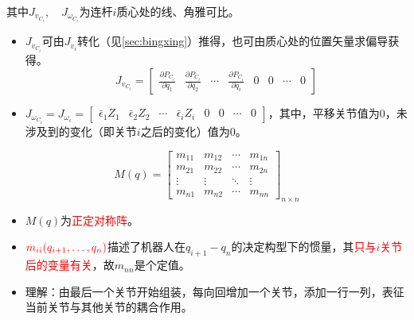 \documentclass[
12pt, %
a4paper, 
oneside, %
]{scrartcl}
\begin{document}
其中$ J_{v_{C_i}}, \quad J_{\omega_{C_i}} $为连杆$ i $质心处的线、角雅可比。
\begin{itemize}
\item $ J_{v_{C_i}} $可由$ J_{v_i} $转化（见\ref{sec:bingxing}）推得，也可由质心处的位置矢量求偏导获得。
$$ J_{v_{C_i}} = \begin{bmatrix} \frac{\partial P_{C_i}}{\partial q_1} & \frac{\partial P_{C_i}}{\partial q_2} & \cdots & \frac{\partial P_{C_i}}{\partial q_i} & 0 & 0 & \cdots & 0 \end{bmatrix} $$
\item $ J_{\omega_{C_i}} = J_{\omega_i} = \begin{bmatrix} \bar{\epsilon}_1 Z_1 & \bar{\epsilon}_2 Z_2 & \cdots & \bar{\epsilon}_i Z_i & 0 & 0 & \cdots & 0 \end{bmatrix} $，其中，平移关节值为$ 0 $，未涉及到的变化（即关节$ i $之后的变化）值为$ 0 $。
\end{itemize}
$$ M(q) = \begin{bmatrix} m_{11} & m_{12} & \cdots & m_{1n} \\ m_{21} & m_{22} & \cdots & m_{2n} \\ \vdots & \vdots & \ddots & \vdots \\ m_{n1} & m_{n2} & \cdots & m_{nn} \end{bmatrix}_{n \times n} $$
\begin{itemize}
\item $ M(q) $为\textcolor{red}{正定对称阵}。
\item $ \textcolor{red}{m_{ii}(q_{i + 1}, \dots, q_n)} $描述了机器人在$ q_{i + 1} - q_n $的决定构型下的惯量，其\textcolor{red}{只与$ i $关节后的变量有关}，故$ m_{nn} $是个定值。
\item 理解：由最后一个关节开始组装，每向回增加一个关节，添加一行一列，表征当前关节与其他关节的耦合作用。
\end{itemize}
\end{document}
